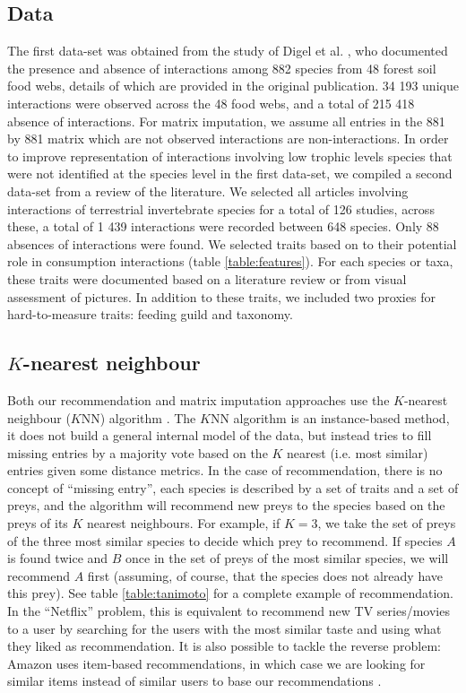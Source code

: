 \documentclass[letterpaper]{article}
\begin{document}
\subsection{Data}

The first data-set was obtained from the study of Digel et al. \cite{dig14}, who
documented the presence and absence of interactions among 882 species from 48
forest soil food webs, details of which are provided in the original
publication. 34 193 unique interactions were observed across the 48 food webs,
and a total of 215 418 absence of interactions. For matrix imputation, we
assume all entries in the 881 by 881 matrix which are not observed interactions
are non-interactions. In order to improve representation of interactions
involving low trophic levels species that were not identified at the species
level in the first data-set, we compiled a second data-set from a review of the
literature. We selected all articles involving interactions of terrestrial
invertebrate species for a total of 126 studies, across these, a total of 1 439
interactions were recorded between 648 species. Only 88 absences of
interactions were found. We selected traits based on to their potential role in
consumption interactions (table \ref{table:features}). For each species or
taxa, these traits were documented based on a literature review or from visual
assessment of pictures. In addition to these traits, we included two proxies
for hard-to-measure traits: feeding guild and taxonomy.



\subsection{$K$-nearest neighbour}

Both our recommendation and matrix imputation approaches use the $K$-nearest
neighbour ($K$NN) algorithm \cite{mur12}. The $K$NN algorithm is an
instance-based method, it does not build a general internal model of the data,
but instead tries to fill missing entries by a majority vote based on the $K$
nearest (i.e. most similar) entries given some distance metrics. In the case of
recommendation, there is no concept of ``missing entry'', each species is
described by a set of traits and a set of preys, and the algorithm will
recommend new preys to the species based on the preys of its $K$ nearest
neighbours. For example, if $K = 3$, we take the set of preys of the three most
similar species to decide which prey to recommend. If species $A$ is found
twice and $B$ once in the set of preys of the most similar species, we will
recommend $A$ first (assuming, of course, that the species does not already
have this prey). See table \ref{table:tanimoto} for a complete example of
recommendation. In the ``Netflix'' problem, this is equivalent to recommend new
TV series/movies to a user by searching for the users with the most similar
taste and using what they liked as recommendation. It is also possible to
tackle the reverse problem: Amazon uses item-based recommendations, in which
case we are looking for similar items instead of similar users to base our
recommendations \cite{agg16}.
\end{document}
